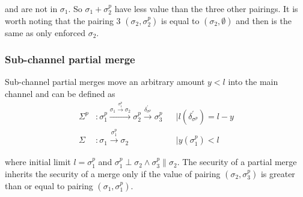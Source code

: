 \documentclass{llncs}
\begin{document}
and are not in $\sigma_1$. So $\sigma_1 + \sigma^p_2$ have less value than the three other pairings. It is worth noting that the pairing 3 $(\sigma_2, \sigma^p_2)$ is equal to $(\sigma_2, \emptyset)$ and then is the same as only enforced $\sigma_2$.

\subsubsection{Sub-channel partial merge} Sub-channel partial merges move an arbitrary amount $y < l$ into the main channel and can be defined as
\begin{align*}
    \Sigma^p&: \sigma_1^p \xrightarrow{\sigma_1 \xrightarrow{\sigma_1^p} \sigma_2} \sigma_2^p \xrightarrow{\delta^\prime_{\sigma^p}} \sigma_3^p & &\mid l(\delta^\prime_{\sigma^p}) = l - y \\
    \Sigma&: \sigma_1 \xrightarrow{\sigma_1^p} \sigma_2 & &\mid y(\sigma_1^p) < l
\end{align*}

where initial limit $l = \sigma^p_1$ and $\sigma^p_1 \perp \sigma_2 \land \sigma^p_3 \parallel \sigma_2$. The security of a partial merge inherits the security of a merge only if the value of pairing $(\sigma_2, \sigma^p_3)$ is greater than or equal to pairing $(\sigma_1, \sigma^p_1)$.
\end{document}

